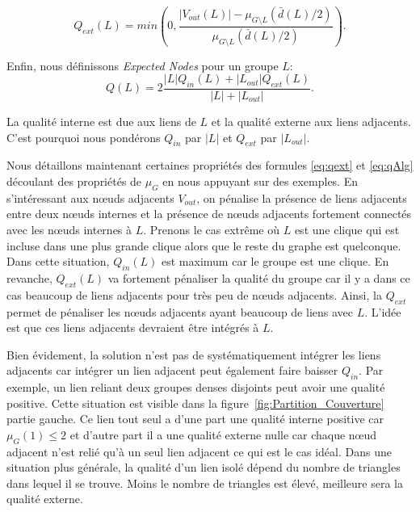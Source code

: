 \begin{equation}
\label{eq:qext} Q_{ext}(L) = min \left(0, \dfrac{|V_{out}(L)| - \mu_{G\setminus L}(\bar{d}(L)/2)}{\mu_{G\setminus L}(\bar{d}(L)/2)} \right).
\end{equation}


Enfin, nous définissons \emph{Expected Nodes} pour un groupe $L$:
\begin{equation}
	\label{eq:qAlg}
	Q(L)  =  2\dfrac{ |L|Q_{in}(L) + |L_{out}|Q_{ext}(L)}{|L|+|L_{out}|}.
\end{equation}

La qualité interne est due aux liens de $L$ et la qualité externe aux liens adjacents.
C'est pourquoi nous pondérons $Q_{in}$ par $|L|$ et $Q_{ext}$ par $|L_{out}|$.



Nous détaillons maintenant certaines propriétés des formules \ref{eq:qext} et \ref{eq:qAlg} découlant des propriétés de $\mu_{G}$ en nous appuyant sur des exemples.
En s'intéressant aux n\oe{}uds adjacents $V_{out}$, on pénalise la présence de liens adjacents entre deux n\oe{}uds internes et la présence de n\oe{}uds adjacents fortement connectés avec les n\oe{}uds internes à $L$.
Prenons le cas extrême où $L$ est une clique qui est incluse dans une plus grande clique alors que le reste du graphe est quelconque.
Dans cette situation, $Q_{in}(L)$ est maximum car le groupe est une clique.
En revanche, $Q_{ext}(L)$ va fortement pénaliser la qualité du groupe car il y a dans ce cas beaucoup de liens adjacents pour très peu de n\oe{}uds adjacents.
Ainsi, la $Q_{ext}$ permet de pénaliser les n\oe{}uds adjacents ayant beaucoup de liens avec $L$.
L'idée est que ces liens adjacents devraient être intégrés à $L$.

Bien évidement, la solution n'est pas de systématiquement intégrer les liens adjacents car intégrer un lien adjacent peut également faire baisser $Q_{in}$.
Par exemple, un lien reliant deux groupes denses disjoints peut avoir une qualité positive.
Cette situation est visible dans la figure~\ref{fig:Partition_Couverture} partie gauche.
Ce lien tout seul a d'une part une qualité interne positive car $\mu_G(1) \leq 2$ et d'autre part il a une qualité externe nulle car chaque n\oe{}ud adjacent n'est relié qu'à un seul lien adjacent ce qui est le cas idéal.
Dans une situation plus générale, la qualité d'un lien isolé dépend du nombre de triangles dans lequel il se trouve.
Moins le nombre de triangles est élevé, meilleure sera la qualité externe.

